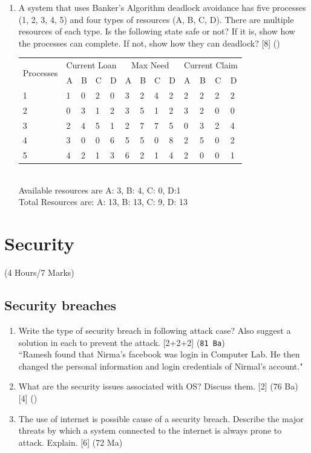 \documentclass[12pt]{article}
\begin{document}
\begin{enumerate}
			\item A system that uses Banker's Algorithm deadlock avoidance has five processes (1, 2, 3, 4, 5) and four types of resources (A, B, C, D). There are multiple resources of each type. Is the following state safe or not? If it is, show how the processes can complete. If not, show how they can deadlock? \hfill [8] ()
			\begin{tabular}{|p{17mm}|p{7mm}|p{7mm}|p{7mm}|p{7mm}||p{7mm}|p{7mm}|p{7mm}|p{7mm}||p{7mm}|p{7mm}|p{7mm}|p{7mm}|}
				\hline
				\multirow{2}{*}{Processes} & \multicolumn{4}{|c||}{Current Loan} & \multicolumn{4}{|c||}{Max Need} &  \multicolumn{4}{|c|}{Current Claim} \\ \cline{2-13}
				& A & B & C & D & A & B & C & D & A & B & C & D \\ \hline
				1 & 1 & 0 & 2 & 0 & 3 & 2 & 4 & 2 & 2 & 2 & 2 & 2\\ \hline
				2 & 0 & 3 & 1 & 2 & 3 & 5 & 1 & 2 & 3 & 2 & 0 & 0\\ \hline
				3 & 2 & 4 & 5 & 1 & 2 & 7 & 7 & 5 & 0 & 3 & 2 & 4\\ \hline
				4 & 3 & 0 & 0 & 6 & 5 & 5 & 0 & 8 & 2 & 5 & 0 & 2\\ \hline
				5 & 4 & 2 & 1 & 3 & 6 & 2 & 1 & 4 & 2 & 0 & 0 & 1\\ \hline
			\end{tabular}\\
			Available resources are A: 3, B: 4, C: 0, D:1\\
			Total Resources are: A: 13, B: 13, C: 9, D: 13			
		\end{enumerate}

	\pagebreak

\section{Security}
	\begin{center}(4 Hours/7 Marks)\end{center}
	\subsection{Security breaches}
		\begin{enumerate}[noitemsep, topsep=0pt]
			\item Write the type of security breach in following attack case? Also suggest a solution in each to prevent the attack. \hfill [2+2+2] (\texttt{81 Ba})\\
			``Ramesh found that Nirma's facebook was login in Computer Lab. He then changed the personal information and login credentials of Nirmal's account."

			\item What are the security issues associated with OS? Discuss them. \hfill [2] (76 Ba) [4] ()

			\item The use of internet is possible cause of a security breach. Describe the major threats by which a system connected to the internet is always prone to attack. Explain. \hfill [6] (72 Ma)
		\end{enumerate}
\end{document}
